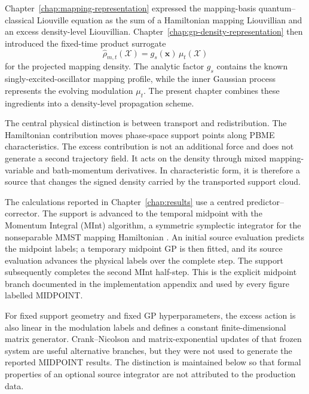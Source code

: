 \documentclass[
  11pt,
  letterpaper,
  onehalfspacing,
  normalmargins,
  equalmargins,
  oneside
]{ut-thesis}
\begin{document}
Chapter~\ref{chap:mapping-representation} expressed the mapping-basis
quantum--classical Liouville equation as the sum of a Hamiltonian mapping
Liouvillian and an excess density-level Liouvillian. Chapter~\ref{chap:gp-density-representation}
then introduced the fixed-time product surrogate
\begin{equation}
\widehat{\rho}_{m,t}(\boldsymbol{\mathcal X})
=
 g_s(\mathbf x)\,\mu_t(\boldsymbol{\mathcal X})
\label{eq:ch5-product-density}
\end{equation}
for the projected mapping density. The analytic factor \(g_s\) contains the
known singly-excited-oscillator mapping profile, while the inner Gaussian
process represents the evolving modulation \(\mu_t\). The present chapter
combines these ingredients into a density-level propagation scheme.

The central physical distinction is between transport and redistribution.
The Hamiltonian contribution moves phase-space support points along PBME
characteristics. The excess contribution is not an additional force and does
not generate a second trajectory field. It acts on the density through mixed
mapping-variable and bath-momentum derivatives. In characteristic form, it is
therefore a source that changes the signed density carried by the transported
support cloud.

The calculations reported in Chapter~\ref{chap:results} use a centred
predictor--corrector. The support is advanced to the temporal midpoint with
the Momentum Integral (MInt) algorithm, a symmetric symplectic integrator for
the nonseparable MMST mapping Hamiltonian
\cite{Church2018JCP,Cook2023JCTC}. An initial source evaluation predicts the
midpoint labels; a temporary midpoint GP is then fitted, and its source
evaluation advances the physical labels over the complete step. The support
subsequently completes the second MInt half-step. This is the explicit
midpoint branch documented in the implementation appendix and used by every
figure labelled MIDPOINT.

For fixed support geometry and fixed GP hyperparameters, the excess action is
also linear in the modulation labels and defines a constant finite-dimensional
matrix generator. Crank--Nicolson and matrix-exponential updates of that frozen
system are useful alternative branches, but they were not used to generate
the reported MIDPOINT results. The distinction is maintained below so that
formal properties of an optional source integrator are not attributed to the
production data.
\end{document}

